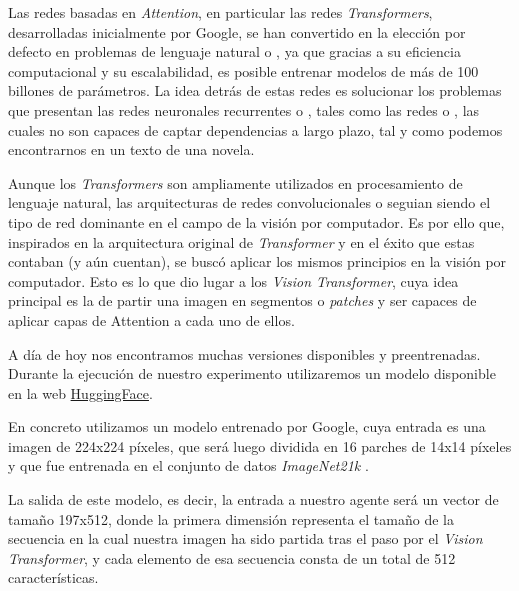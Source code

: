 Las redes basadas en \textit{Attention}, en particular las redes \textit{Transformers}, desarrolladas inicialmente por Google, se han convertido en la elección por defecto en problemas de lenguaje natural o , ya que gracias a su eficiencia computacional y su escalabilidad, es posible entrenar modelos de más de 100 billones de parámetros. La idea detrás de estas redes es solucionar los problemas que presentan las redes neuronales recurrentes o , tales como las redes  o , las cuales no son capaces de captar dependencias a largo plazo, tal y como podemos encontrarnos en un texto de una novela.
\medskip

Aunque los \textit{Transformers} son ampliamente utilizados en procesamiento de lenguaje natural, las arquitecturas de redes convolucionales o  seguian siendo el tipo de red dominante en el campo de la visión por computador. Es por ello que, inspirados en la arquitectura original de \textit{Transformer} y en el éxito que estas contaban (y aún cuentan), se buscó aplicar los mismos principios en la visión por computador. Esto es lo que dio lugar a los \textit{Vision Transformer}, cuya idea principal es la de partir una imagen en segmentos o \textit{patches} y ser capaces de aplicar capas de Attention a cada uno de ellos. 
\medskip

A día de hoy nos encontramos muchas versiones disponibles y preentrenadas. Durante la ejecución de nuestro experimento utilizaremos un modelo disponible en la web \href{https://huggingface.co/docs/transformers/model_doc/vit#transformers.ViTModel}{HuggingFace}.
\medskip

En concreto utilizamos un modelo entrenado por Google, cuya entrada es una imagen de 224x224 píxeles, que será luego dividida en 16 parches de 14x14 píxeles y que fue entrenada en el conjunto de datos \textit{ImageNet21k} \citep{imagenet21k}.
\medskip

La salida de este modelo, es decir, la entrada a nuestro agente será un vector de tamaño 197x512, donde la primera dimensión representa el tamaño de la secuencia en la cual nuestra imagen ha sido partida tras el paso por el \textit{Vision Transformer}, y cada elemento de esa secuencia consta de un total de 512 características.